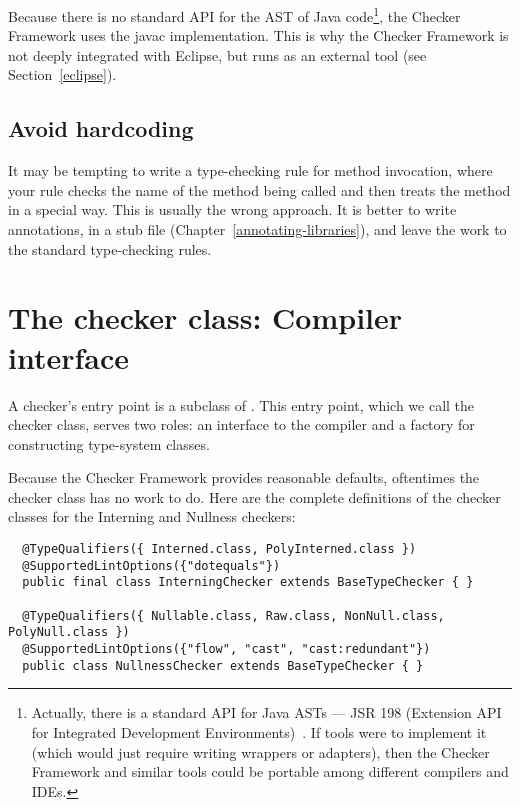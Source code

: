 Because there is no standard API for the AST of Java code\footnote{Actually,
there is a standard API for Java ASTs --- JSR 198 (Extension API for
Integrated Development Environments)~\cite{JSR198}.  If tools were to
implement it
(which would just require writing wrappers or adapters), then the Checker
Framework and similar tools could be portable among different compilers and
IDEs.}, the Checker
Framework uses the javac implementation.  This is why the Checker Framework
is not deeply integrated with Eclipse, but runs as an external tool (see
Section~\ref{eclipse}).


\subsection{Avoid hardcoding\label{avoid-hardcoding}}

It may be tempting to write a type-checking rule for method invocation,
where your rule checks the name of the method being called and then treats
the method in a special way.  This is usually the wrong approach.  It
is better to write annotations, in a stub file
(Chapter~\ref{annotating-libraries}), and leave the work to the standard
type-checking rules.


\section{The checker class:  Compiler interface\label{writing-compiler-interface}}

A checker's entry point is a subclass of .  This entry
point, which we call the checker class, serves two
roles:  an interface to the compiler and a factory for constructing
type-system classes.

Because the Checker Framework provides reasonable defaults, oftentimes the
checker class has no work to do.  Here are the complete definitions of the
checker classes for the Interning and Nullness checkers:

\begin{Verbatim}
  @TypeQualifiers({ Interned.class, PolyInterned.class })
  @SupportedLintOptions({"dotequals"})
  public final class InterningChecker extends BaseTypeChecker { }

  @TypeQualifiers({ Nullable.class, Raw.class, NonNull.class, PolyNull.class })
  @SupportedLintOptions({"flow", "cast", "cast:redundant"})
  public class NullnessChecker extends BaseTypeChecker { }
\end{Verbatim}


